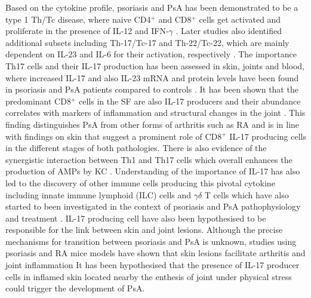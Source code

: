 {Based on the cytokine profile, psoriasis and PsA has been demonstrated to be a type 1 Th/Tc disease, where naive CD4$^{+}$ and CD8$^{+}$ cells get activated and proliferate in the presence of IL-12 and IFN-$\gamma$ \parencite{Austin1999,Perera2012}. Later studies also identified additional subsets including Th-17/Tc-17 and Th-22/Tc-22, which are mainly dependent on IL-23 and IL-6 for their activation, respectively \parencite{Mahil2016}. The importance Th17 cells and their IL-17 production has been assessed in skin, joints and blood, where increased IL-17 and also IL-23 mRNA and protein levels have been found in psoriasis and PsA patients compared to controls \parencite{Cai2012, reference for joints}. It has been shown that the predominant CD8$^{+}$ cells in the SF are  also IL-17 producers and their abundance correlates with markers of inflammation and structural changes in the joint \parencite{Menon2014}. This finding distinguishes PsA from other forms of arthritis such as RA and is in line with findings on skin that suggest a prominent role of CD8$^{+}$ IL-17 producing cells in the different stages of both pathologies. There is also evidence of the synergistic interaction between Th1 and Th17 cells which overall enhances the production of AMPs by KC \parencite{Kryczek2008}. Understanding of the importance of IL-17 has also led to the discovery of other immune cells producing this pivotal cytokine including innate immune lymphoid (ILC) cells and $\gamma$$\delta$ T cells which have also started to been investigated in the context of psoriasis and PsA pathophysiology and treatment \parencite{Meglio2014,Leijten2015}.
IL-17 producing cell have also been hypothesised to be responsible for the link between skin and joint lesions. Although the precise mechanisms for transition between psoriasis and PsA is unknown, studies using psoriasis and RA mice models have shown that skin lesions facilitate arthritis and joint inflammation %
It has been hypothesised that the presence of IL-17 producer cells in inflamed skin located nearby the enthesis of joint under physical stress could trigger the development of PsA.

}
